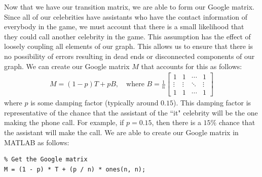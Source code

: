 \documentclass[11pt]{article}
\begin{document}
      \label{create-google-matrix}
      Now that we have our transition matrix, we are able to form our Google matrix.
      Since all of our celebrities have assistants who have the contact information of everybody in the game, we must account that there is a small likelihood that they could call another celebrity in the game.
      This assumption has the effect of loosely coupling all elements of our graph.  This allows us to ensure that there is no possibility of errors resulting in dead ends or disconnected components of our graph.
      We can create our Google matrix $M$ that accounts for this as follows:
      \begin{gather}
        M = (1 - p) T + p B, \quad \text{where } B = \frac{1}{n}
        \begin{bmatrix}
        1 & 1 & \cdots & 1 \\
        \vdots & \vdots & \ddots & \vdots \\
        1 & 1 & \cdots & 1
        \end{bmatrix}
      \end{gather}
      where $p$ is some damping factor (typically around $0.15$).
      This damping factor is representative of the chance that the assistant of the ``it" celebrity will be the one making the phone call.
      For example, if $p = 0.15$, then there is a $15\%$ chance that the assistant will make the call.
      We are able to create our Google matrix in MATLAB as follows:
\begin{lstlisting}
% Get the Google matrix
M = (1 - p) * T + (p / n) * ones(n, n);
\end{lstlisting}
\end{document}
